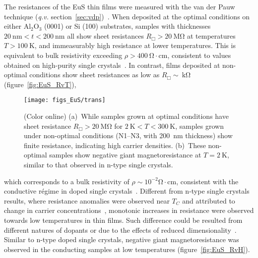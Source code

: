 The resistances of the EuS thin films were measured with the van der Pauw technique (\textit{q.v.} section~\ref{sec:vdp})~\cite{VdP1958}. When deposited at the optimal conditions on either Al$_2$O$_3$ (0001) or Si (100) substrates, samples with thicknesses $20~\mathrm{nm}<t<200~\mathrm{nm}$ all show sheet resistances $R_\Box>20~\mathrm{M\Omega}$ at temperatures $T > 100~\mathrm{K}$, and immeasurably  high resistance at lower temperatures. This is equivalent to bulk resistivity exceeding  $\rho>400~\mathrm{\Omega\cdot{}cm}$, consistent to values obtained on high-purity single crystals~\cite{EuS_Shafer}. In contrast, films deposited at non-optimal conditions show sheet resistances as low as $R_\Box\sim~\mathrm{k\Omega}$ (figure~\ref{fig:EuS_RvT}), %
%
\begin{figure}[ht]%
    \subfloat{\label{fig:EuS_RvT}}%
    \subfloat{\label{fig:EuS_RvH}}%
    \centering%
    \texttt{[image: figs\_EuS/trans]}%
    \caption[Electrical properties of EuS thin films]{\label{fig:EuS_transport}(Color online) (a)~While samples grown at optimal conditions have sheet resistance $R_\Box>20~\mathrm{M\Omega}$ for $2~\mathrm{K}<T<300~\mathrm{K}$, samples grown under non-optimal conditions (N1--N3, with 200~nm thickness) show finite resistance, indicating high carrier densities. (b)~These non-optimal samples show negative giant magnetoresistance at $T=2~\mathrm{K}$, similar to that observed in n-type single crystals.}%
\end{figure}%
%
which corresponds to a bulk resistivity of $\rho\sim10^{-2}\mathrm{\Omega\cdot{}cm}$, consistent with the conductive r\'egime in doped single crystals~\cite{EuS_ntype}. Different from n-type single crystals results, where resistance anomalies were observed near $T_C$ and attributed to change in carrier concentrations~\cite{EuS_ntype, EuX_doped_transport}, monotonic increases in resistance were observed towards low temperatures in thin films. Such difference could be resulted from different natures of dopants or due to the effects of reduced dimensionality~\cite{2D_conduction}. Similar to n-type doped single crystals, negative giant magnetoresistance was observed in the conducting samples at low temperatures (figure~\ref{fig:EuS_RvH}).

